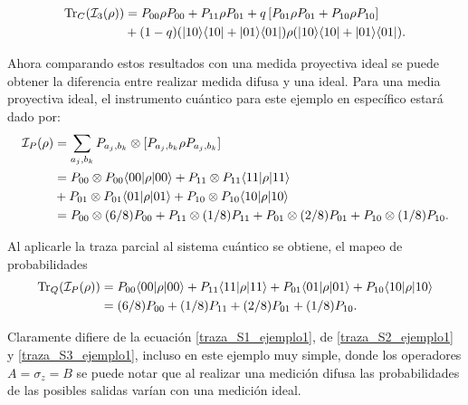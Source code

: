 \begin{equation}\label{traza_A3_ejemplo1.1}
    \begin{split}
        {\rm Tr}_C(\mathcal{I}_3(\rho)) &=P_{00} \rho P_{00} + P_{11} \rho P_{01}+q\left[P_{01}\rho P_{01}+ P_{10}\rho P_{10}\right]\\
        &+{(1-q)} (|10\rangle \langle10|+|01\rangle \langle01|)\rho (|10\rangle \langle10|+|01\rangle \langle01|).\\
    \end{split}
\end{equation}


Ahora comparando estos resultados con una medida proyectiva ideal se puede obtener la diferencia entre realizar medida difusa y una ideal. Para una media proyectiva ideal, el instrumento cuántico para este ejemplo en específico estará dado por: \begin{equation}\label{proyectiva_ideal_ejemplo}
    \begin{split}
        \mathcal{I}_P(\rho)&=\sum_{a_j,b_k}P_{a_j,b_k}\otimes[P_{a_j,b_k}\rho P_{a_j,b_k}]\\
        &=P_{00}\otimes P_{00} \langle 00|\rho|00\rangle + P_{11}\otimes P_{11} \langle 11|\rho|11\rangle\\
        &+P_{01} \otimes P_{01}\langle 01|\rho|01\rangle +P_{10} \otimes P_{10} \langle 10|\rho|10\rangle\\
        &=P_{00}\otimes (6/8)P_{00} + P_{11}\otimes (1/8)P_{11}+P_{01} \otimes (2/8)P_{01} +P_{10} \otimes (1/8)P_{10}.\\
    \end{split}
\end{equation}


Al aplicarle la traza parcial al sistema cuántico se obtiene, el mapeo de probabilidades \begin{equation}\label{traza_SP_ejemplo1}
    \begin{split}
        {\rm Tr}_Q(\mathcal{I}_P(\rho)) &= P_{00} \langle 00|\rho|00\rangle + P_{11} \langle 11|\rho|11\rangle+P_{01}\langle 01|\rho|01\rangle +P_{10} \langle 10|\rho|10\rangle\\
        &=(6/8)P_{00} + (1/8)P_{11}+(2/8)P_{01} + (1/8)P_{10}.\\
    \end{split}
\end{equation}

Claramente difiere de la ecuación {\ref{traza_S1_ejemplo1}}, de {\ref{traza_S2_ejemplo1}} y {\ref{traza_S3_ejemplo1}}, incluso en este ejemplo muy simple, donde los operadores $A=\sigma _z=B$ se puede notar que al realizar una medición difusa las probabilidades de las posibles salidas varían con una medición ideal.

